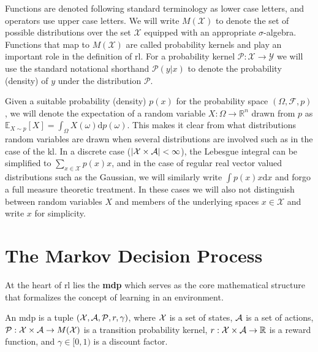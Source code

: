Functions are denoted following standard terminology as lower case letters, and operators use upper case letters.
We will write $M(\mathcal{X})$ to denote the set of possible distributions over the set $\mathcal{X}$ equipped with an appropriate $\sigma$-algebra.
Functions that map to $M(\mathcal{X})$ are called probability kernels and play an important role in the definition of \ac{rl}.
For a probability kernel $\mathcal{P}: \mathcal{X} \rightarrow \mathcal{Y}$ we will use the standard notational shorthand $\mathcal{P}(y|x)$ to denote the probability (density) of $y$ under the distribution $\mathcal{P}$.

Given a suitable probability (density) $p(x)$ for the probability space $(\Omega,\mathcal{F},p)$, we will denote the expectation of a random variable $X: \Omega \rightarrow \mathbb{R}^n$ drawn from $p$ as $\mathbb{E}_{X \sim p}\left[X\right] = \int_{\Omega} X(\omega) \mathrm{d} p(\omega)$.
This makes it clear from what distributions random variables are drawn when several distributions are involved such as in the case of the \ac{kl}.
In a discrete case ($|\mathcal{X} \times \mathcal{A}| < \infty$), the Lebesgue integral can be simplified to $\sum_{x \in \mathcal{X}} p(x) x$, and in the case of regular real vector valued distributions such as the Gaussian, we will similarly write $\int p(x) x \mathrm{d} x$ and forgo a full measure theoretic treatment.
In these cases we will also not distinguish between random variables $X$ and members of the underlying spaces $x \in \mathcal{X}$ and write $x$ for simplicity.


\section{The Markov Decision Process}
\label{chap:background:mdp}

At the heart of \ac{rl} lies the \textbf{\ac{mdp}} which serves as the core mathematical structure that formalizes the concept of learning in an environment.


\begin{definition}
An {\ac{mdp}} is a tuple $(\mathcal{X},\mathcal{A},\mathcal{P},r,\gamma)$, where $\mathcal{X}$ is a set of states, $\mathcal{A}$ is a set of actions, $\mathcal{P}: \mathcal{X} \times \mathcal{A} \rightarrow M(\mathcal{X})$ is a transition probability kernel, $r: \mathcal{X} \times \mathcal{A} \rightarrow \mathbb{R}$ is a reward function, and $\gamma \in [0,1)$ is a discount factor.
\end{definition}

